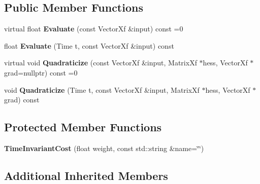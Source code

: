 \subsection*{Public Member Functions}
\begin{DoxyCompactItemize}
\item 
virtual float {\bfseries Evaluate} (const Vector\+Xf \&input) const =0\hypertarget{classilqgames_1_1_time_invariant_cost_a61c214ac9833c3f42b51167bdec1cbc7}{}\label{classilqgames_1_1_time_invariant_cost_a61c214ac9833c3f42b51167bdec1cbc7}

\item 
float {\bfseries Evaluate} (Time t, const Vector\+Xf \&input) const \hypertarget{classilqgames_1_1_time_invariant_cost_a1e59c75a8765e4d89243c20838cc2bed}{}\label{classilqgames_1_1_time_invariant_cost_a1e59c75a8765e4d89243c20838cc2bed}

\item 
virtual void {\bfseries Quadraticize} (const Vector\+Xf \&input, Matrix\+Xf $\ast$hess, Vector\+Xf $\ast$grad=nullptr) const =0\hypertarget{classilqgames_1_1_time_invariant_cost_a0d43234a62fc4a3117492bf70fccd39d}{}\label{classilqgames_1_1_time_invariant_cost_a0d43234a62fc4a3117492bf70fccd39d}

\item 
void {\bfseries Quadraticize} (Time t, const Vector\+Xf \&input, Matrix\+Xf $\ast$hess, Vector\+Xf $\ast$grad) const \hypertarget{classilqgames_1_1_time_invariant_cost_a185aa5080bcdaa68804810d1a046ebcd}{}\label{classilqgames_1_1_time_invariant_cost_a185aa5080bcdaa68804810d1a046ebcd}

\end{DoxyCompactItemize}
\subsection*{Protected Member Functions}
\begin{DoxyCompactItemize}
\item 
{\bfseries Time\+Invariant\+Cost} (float weight, const std\+::string \&name=\char`\"{}\char`\"{})\hypertarget{classilqgames_1_1_time_invariant_cost_ae84f729918d8c10d9dfa962d57baca6d}{}\label{classilqgames_1_1_time_invariant_cost_ae84f729918d8c10d9dfa962d57baca6d}

\end{DoxyCompactItemize}
\subsection*{Additional Inherited Members}


